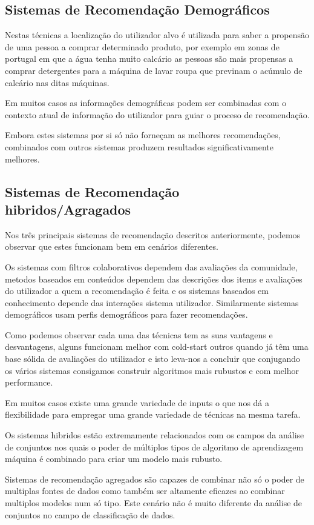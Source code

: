 \hfill
\subsection{Sistemas de Recomendação Demográficos}\hfill


 \par Nestas técnicas a localização do utilizador alvo é utilizada para saber a propensão de uma pessoa a comprar determinado produto, por exemplo em zonas de portugal em que a água tenha muito calcário as pessoas são mais propensas a comprar detergentes para a máquina de lavar roupa que previnam o acúmulo de calcário nas ditas máquinas.
 \par Em muitos casos as informações demográficas podem ser combinadas com o contexto atual de informação do utilizador para guiar o proceso de recomendação.
 \par Embora estes sistemas por si só não forneçam as melhores recomendações, combinados com outros sistemas produzem resultados significativamente melhores.
\hfill
\subsection{Sistemas de Recomendação hibridos/Agragados}
\hfill
 \par Nos três principais sistemas de recomendação descritos anteriormente, podemos observar que estes funcionam bem em cenários diferentes. 
 \par Os sistemas com filtros colaborativos dependem das avaliações da comunidade, metodos baseados em conteúdos dependem das descrições dos items e avaliações do utilizador a quem a recomendação é feita e os sistemas baseados em conhecimento depende das interações sistema utilizador. Similarmente sistemas demográficos usam perfis demográficos para fazer recomendações.
 \par Como podemos observar cada uma das técnicas tem as suas vantagens e desvantagens, alguns funcionam melhor com cold-start outros quando já têm uma base sólida de avaliações do utilizador e isto leva-nos a concluir que conjugando os vários sistemas consigamos construir algoritmos mais rubustos e com melhor performance.
 \par Em muitos casos existe uma grande variedade de inputs o que nos dá a flexibilidade para empregar uma grande variedade de técnicas na mesma tarefa.
 \par Os sistemas hibridos estão extremamente relacionados com os campos da análise de conjuntos nos quais o poder de múltiplos tipos de algoritmo de aprendizagem máquina é combinado para criar um modelo mais rubusto.
 \par Sistemas de recomendação agregados são capazes de combinar não só o poder de multiplas fontes de dados como também ser altamente eficazes ao combinar multiplos modelos num só tipo. Este cenário não é muito diferente da análise de conjuntos no campo de classificação de dados.

